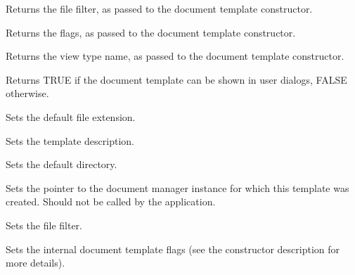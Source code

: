 Returns the file filter, as passed to the document template constructor.



Returns the flags, as passed to the document template constructor.



Returns the view type name, as passed to the document template constructor.



Returns TRUE if the document template can be shown in user dialogs, FALSE otherwise.



Sets the default file extension.



Sets the template description.



Sets the default directory.



Sets the pointer to the document manager instance for which this template was created.
Should not be called by the application.



Sets the file filter.



Sets the internal document template flags (see the constructor description for more details).


